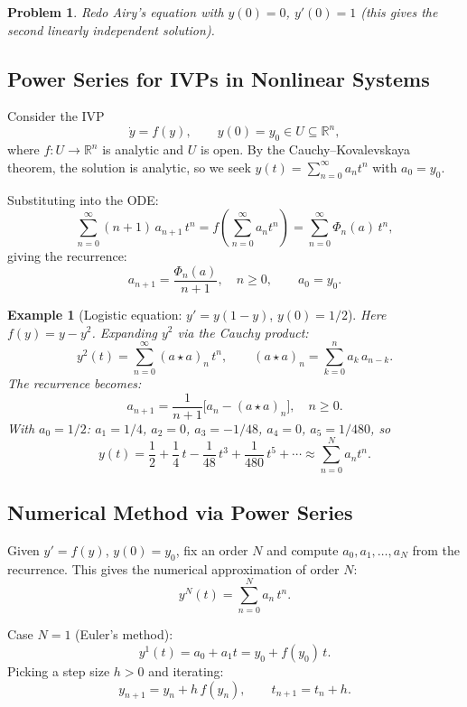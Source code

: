 \documentclass{article}
\newtheorem{problem}{Problem}
\newtheorem*{example}{Example}
\newcommand{\R}{\mathbb{R}}
\newcommand{\conv}{\star}
\begin{document}
\begin{problem}
    Redo Airy's equation with $y(0) = 0$, $y'(0) = 1$ (this gives the second linearly independent solution).
\end{problem}

\subsection{Power Series for IVPs in Nonlinear Systems}

Consider the IVP
\[\dot{y} = f(y),\qquad y(0) = y_0 \in U \subseteq \R^n,\]
where $f: U \to \R^n$ is analytic and $U$ is open. By the Cauchy--Kovalevskaya theorem, the solution is analytic, so we seek $y(t) = \sum_{n=0}^\infty a_n t^n$ with $a_0 = y_0$.

Substituting into the ODE:
\[\sum_{n=0}^\infty (n+1)\,a_{n+1}\,t^n = f\!\left(\sum_{n=0}^\infty a_n t^n\right) = \sum_{n=0}^\infty \Phi_n(a)\,t^n,\]
giving the recurrence:
\[\boxed{a_{n+1} = \frac{\Phi_n(a)}{n+1},\quad n\geq 0,\qquad a_0 = y_0.}\]

\begin{example}[Logistic equation: $y' = y(1-y)$, $y(0) = 1/2$]
    Here $f(y) = y - y^2$. Expanding $y^2$ via the Cauchy product:
    \[y^2(t) = \sum_{n=0}^\infty (a\conv a)_n\,t^n,\qquad (a\conv a)_n = \sum_{k=0}^n a_k\,a_{n-k}.\]
    The recurrence becomes:
    \[a_{n+1} = \frac{1}{n+1}\Big[a_n - (a\conv a)_n\Big],\quad n\geq 0.\]
    With $a_0 = 1/2$: $a_1 = 1/4$, $a_2 = 0$, $a_3 = -1/48$, $a_4 = 0$, $a_5 = 1/480$, so
    \[y(t) = \frac{1}{2} + \frac{1}{4}\,t - \frac{1}{48}\,t^3 + \frac{1}{480}\,t^5 + \cdots \approx \sum_{n=0}^N a_n t^n.\]
\end{example}

\subsection{Numerical Method via Power Series}

Given $y' = f(y)$, $y(0) = y_0$, fix an order $N$ and compute $a_0, a_1, \ldots, a_N$ from the recurrence. This gives the numerical approximation of order $N$:
\[y^N(t) = \sum_{n=0}^N a_n\,t^n.\]

Case $N = 1$ (Euler's method):
\[y^1(t) = a_0 + a_1 t = y_0 + f(y_0)\,t.\]
Picking a step size $h > 0$ and iterating:
\[\boxed{y_{n+1} = y_n + h\,f(y_n),\qquad t_{n+1} = t_n + h.}\]
\end{document}
